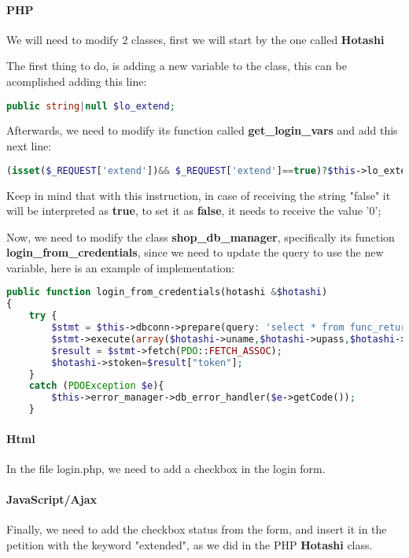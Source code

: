 \paragraph{PHP}
\begin{flushleft}
    We will need to modify 2 classes, first we will start by the one called \textbf{Hotashi}

    The first thing to do, is adding a new variable to the class, this can be acomplished adding this line:
    \begin{lstlisting}[language=php,label={lst:php_extended1}]
public string|null $lo_extend;\end{lstlisting}
\end{flushleft}
\begin{flushleft}
    Afterwards, we need to modify its function called \textbf{get\_login\_vars} and add this next line:
\begin{lstlisting}[language=php,label={lst:php_extended2}]
(isset($_REQUEST['extend'])&& $_REQUEST['extend']==true)?$this->lo_extend=true:$this->lo_extend=false;\end{lstlisting}
Keep in mind that with this instruction, in case of receiving the string "false" it will be interpreted as \textbf{true},
to set it as \textbf{false}, it needs to receive the value '0';
\end{flushleft}

\begin{flushleft}
Now, we need to modify the class \textbf{shop\_db\_manager}, specifically its function \textbf{login\_from\_credentials},
since we need to update the query to use the new variable, here is an example of implementation:
\begin{lstlisting}[language=php,label={lst:php_extended3}]
public function login_from_credentials(hotashi &$hotashi)
{
    try {
        $stmt = $this->dbconn->prepare(query: 'select * from func_return_session_token_from_credentials(?,?,?) as token;');
        $stmt->execute(array($hotashi->uname,$hotashi->upass,$hotashi->lo_extend));
        $result = $stmt->fetch(PDO::FETCH_ASSOC);
        $hotashi->stoken=$result["token"];
    }
    catch (PDOException $e){
        $this->error_manager->db_error_handler($e->getCode());
    }\end{lstlisting}

\end{flushleft}

\paragraph{Html}
\begin{flushleft}
    In the file login.php, we need to add a checkbox in the login form.
\end{flushleft}

\paragraph{JavaScript/Ajax}
\begin{flushleft}
    Finally, we need to add the checkbox status from the form, and insert it in the petition with the keyword
    "extended", as we did in the PHP \textbf{Hotashi} class.
\end{flushleft}


